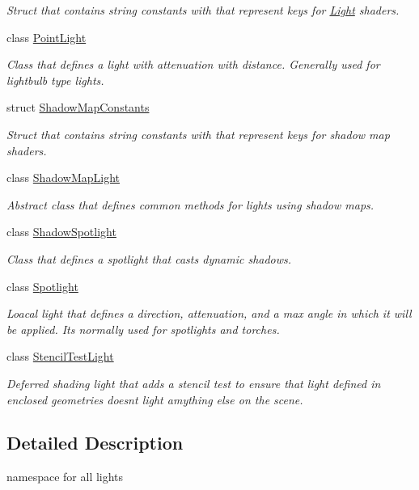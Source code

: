 \begin{DoxyCompactItemize}
\begin{DoxyCompactList}\small\item\em Struct that contains string constants with that represent keys for \mbox{\hyperlink{class_geometry_engine_1_1_geometry_world_item_1_1_geometry_light_1_1_light}{Light}} shaders. \end{DoxyCompactList}\item 
class \mbox{\hyperlink{class_geometry_engine_1_1_geometry_world_item_1_1_geometry_light_1_1_point_light}{Point\+Light}}
\begin{DoxyCompactList}\small\item\em Class that defines a light with attenuation with distance. Generally used for lightbulb type lights. \end{DoxyCompactList}\item 
struct \mbox{\hyperlink{struct_geometry_engine_1_1_geometry_world_item_1_1_geometry_light_1_1_shadow_map_constants}{Shadow\+Map\+Constants}}
\begin{DoxyCompactList}\small\item\em Struct that contains string constants with that represent keys for shadow map shaders. \end{DoxyCompactList}\item 
class \mbox{\hyperlink{class_geometry_engine_1_1_geometry_world_item_1_1_geometry_light_1_1_shadow_map_light}{Shadow\+Map\+Light}}
\begin{DoxyCompactList}\small\item\em Abstract class that defines common methods for lights using shadow maps. \end{DoxyCompactList}\item 
class \mbox{\hyperlink{class_geometry_engine_1_1_geometry_world_item_1_1_geometry_light_1_1_shadow_spotlight}{Shadow\+Spotlight}}
\begin{DoxyCompactList}\small\item\em Class that defines a spotlight that casts dynamic shadows. \end{DoxyCompactList}\item 
class \mbox{\hyperlink{class_geometry_engine_1_1_geometry_world_item_1_1_geometry_light_1_1_spotlight}{Spotlight}}
\begin{DoxyCompactList}\small\item\em Loacal light that defines a direction, attenuation, and a max angle in which it will be applied. It\textquotesingle{}s normally used for spotlights and torches. \end{DoxyCompactList}\item 
class \mbox{\hyperlink{class_geometry_engine_1_1_geometry_world_item_1_1_geometry_light_1_1_stencil_test_light}{Stencil\+Test\+Light}}
\begin{DoxyCompactList}\small\item\em Deferred shading light that adds a stencil test to ensure that light defined in enclosed geometries doesn\textquotesingle{}t light amything else on the scene. \end{DoxyCompactList}\end{DoxyCompactItemize}


\subsection{Detailed Description}
namespace for all lights 
